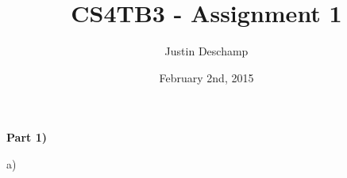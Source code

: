 \documentclass[12pt]{article}
\title{CS4TB3 - Assignment 1}
\author{Justin Deschamp}
\date{February 2nd, 2015}
\begin{document}
\maketitle

\textbf{Part 1)}

\item[a)]
\end{document}
